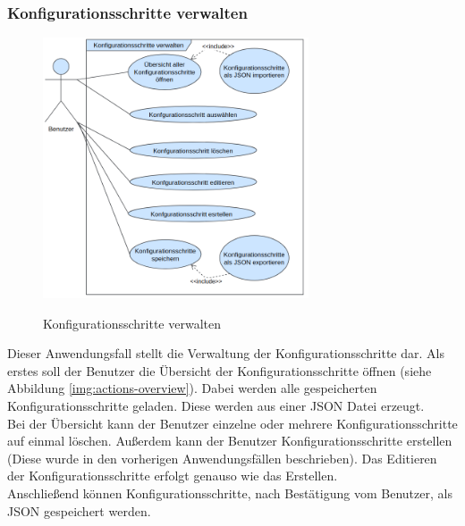 \subsubsection{Konfigurationsschritte verwalten}
\begin{figure}[H]
	\caption{Konfigurationsschritte verwalten}
	\centering
	\includegraphics[width=0.7\textwidth]{images/af/af-ks-verwalten}
	\label{img:af-ks-verwalten}
\end{figure}
Dieser Anwendungsfall stellt die Verwaltung der Konfigurationsschritte dar. Als erstes soll der Benutzer die Übersicht der Konfigurationsschritte öffnen (siehe Abbildung \ref{img:actions-overview}). Dabei werden alle gespeicherten Konfigurationsschritte geladen. Diese werden aus einer JSON Datei erzeugt. \\
Bei der Übersicht kann der Benutzer einzelne oder mehrere Konfigurationsschritte auf einmal löschen. Außerdem kann der Benutzer Konfigurationsschritte erstellen (Diese wurde in den vorherigen Anwendungsfällen beschrieben). Das Editieren der Konfigurationsschritte erfolgt genauso wie das Erstellen.\\
Anschließend können Konfigurationsschritte, nach Bestätigung vom Benutzer, als JSON gespeichert werden.
